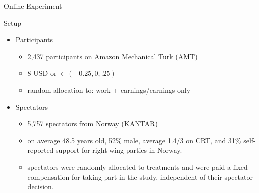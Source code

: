 \documentclass{beamer}
\begin{document}
\begin{frame}{Online Experiment}

	\begin{block}{Setup}

		\begin{itemize}
			\item Participants
			\begin{itemize}
				\item 2,437 participants on Amazon Mechanical Turk (AMT)
				\item 8 USD or $\in (-0.25, 0, .25)$
				\item random allocation to: work + earnings/earnings only
			\end{itemize}
			\item Spectators
			\begin{itemize}
				\item 5,757 spectators from Norway (KANTAR)
				\item on average 48.5 years old, 52\% male, average 1.4/3 on CRT, and 31\% self-reported support for right-wing parties in Norway.
				\item spectators were randomly allocated to treatments and were paid a fixed compensation for taking part in the study, independent of their spectator decision.
			\end{itemize}
		\end{itemize}
	\end{block}
\end{frame}
\end{document}

